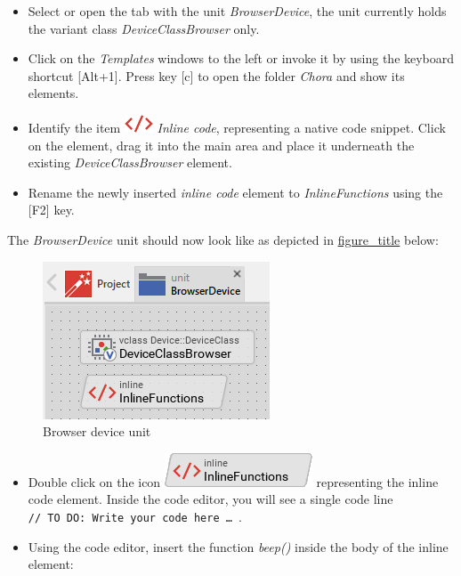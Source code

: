 \documentclass[
  a4paper,
,tablecaptionabove
]{scrbook}
\begin{document}
\begin{itemize}
\item
  Select or open the tab with the unit \emph{BrowserDevice}, the unit
  currently holds the variant class \emph{DeviceClassBrowser} only.
\item
  Click on the \emph{Templates} windows to the left or invoke it by
  using the keyboard shortcut {[}Alt+1{]}. Press key {[}c{]} to
  open the folder \emph{Chora} and show its elements.
\item
  Identify the item
  \includegraphics{./../asciidoc/modules/ROOT/assets/images/icons/InlineCodeIcon.png}
  \emph{Inline code}, representing a native code snippet. Click on the
  element, drag it into the main area and place it underneath the
  existing \emph{DeviceClassBrowser} element.
\item
  Rename the newly inserted \emph{inline code} element to
  \emph{InlineFunctions} using the {[}F2{]} key.
\end{itemize}

The \emph{BrowserDevice} unit should now look like as depicted in
\protect\hyperlink{fig:BrowserDevice}{figure\_title} below:

\begin{figure}
\centering
\includegraphics{./../asciidoc/modules/ROOT/assets/images/deviceintegration/UnitBrowserDevice.png}
\caption{Browser device unit}
\end{figure}

\begin{itemize}
\item
  Double click on the icon
  \includegraphics{./../asciidoc/modules/ROOT/assets/images/icons/InlineFunctionsIcon.png}
  representing the inline code element. Inside the code editor, you will
  see a single code line
  \texttt{//\ TO\ DO:\ Write\ your\ code\ here\ \ldots{}​\ }.
\item
  Using the code editor, insert the function \emph{beep()} inside the
  body of the inline element:
\end{itemize}
\end{document}

